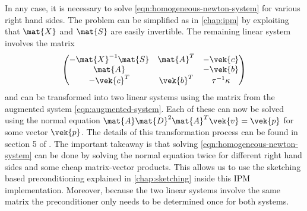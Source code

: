 In any case, it is necessary to solve \cref{eqn:homogeneous-newton-system} for various right hand sides.
The problem can be simplified as in \cref{chap:ipm} by exploiting that \(\mat{X}\) and \(\mat{S}\) are easily invertible.
The remaining linear system involves the matrix
\begin{equation}
  \begin{pmatrix}
    -\mat{X}^{-1}\mat{S} & \mat{A}^T & -\vek{c} \\
    \mat{A}              &           & -\vek{b} \\
    -\vek{c}^T           & \vek{b}^T & \tau^{-1}\kappa 
  \end{pmatrix}
\end{equation}
and can be transformed into two linear systems using the matrix from the augmented system \cref{eqn:augmented-system}.
Each of these can now be solved using the normal equation \(\mat{A}\mat{D}^2\mat{A}^T\vek{v} = \vek{p}\) for some vector \(\vek{p}\).
The details of this transformation process can be found in section 5 of \cite{AndersenAndersen-MosekInteriorPointMethod}.
The important takeaway is that solving \cref{eqn:homogeneous-newton-system} can be done by solving the normal equation twice for different right hand sides and some cheap matrix-vector products.
This allows us to use the sketching based preconditioning explained in \cref{chap:sketching} inside this IPM implementation.
Moreover, because the two linear systems involve the same matrix the preconditioner only needs to be determined once for both systems.

